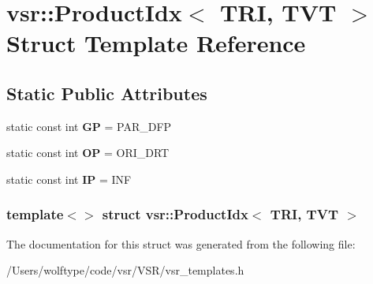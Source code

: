 \hypertarget{structvsr_1_1_product_idx_3_01_t_r_i_00_01_t_v_t_01_4}{\section{vsr\-:\-:Product\-Idx$<$ T\-R\-I, T\-V\-T $>$ Struct Template Reference}
\label{structvsr_1_1_product_idx_3_01_t_r_i_00_01_t_v_t_01_4}
}
\subsection*{Static Public Attributes}
\begin{DoxyCompactItemize}
\item 
\hypertarget{structvsr_1_1_product_idx_3_01_t_r_i_00_01_t_v_t_01_4_a285d21b6f6fbcb2af791c2a0effcf419}{static const int {\bfseries G\-P} = P\-A\-R\-\_\-\-D\-F\-P}\label{structvsr_1_1_product_idx_3_01_t_r_i_00_01_t_v_t_01_4_a285d21b6f6fbcb2af791c2a0effcf419}

\item 
\hypertarget{structvsr_1_1_product_idx_3_01_t_r_i_00_01_t_v_t_01_4_a0d257c826a681805b6006d9fc048092e}{static const int {\bfseries O\-P} = O\-R\-I\-\_\-\-D\-R\-T}\label{structvsr_1_1_product_idx_3_01_t_r_i_00_01_t_v_t_01_4_a0d257c826a681805b6006d9fc048092e}

\item 
\hypertarget{structvsr_1_1_product_idx_3_01_t_r_i_00_01_t_v_t_01_4_a71aa03de8cbaf048ccfd41b77726730a}{static const int {\bfseries I\-P} = I\-N\-F}\label{structvsr_1_1_product_idx_3_01_t_r_i_00_01_t_v_t_01_4_a71aa03de8cbaf048ccfd41b77726730a}

\end{DoxyCompactItemize}
\subsubsection*{template$<$$>$ struct vsr\-::\-Product\-Idx$<$ T\-R\-I, T\-V\-T $>$}



The documentation for this struct was generated from the following file\-:\begin{DoxyCompactItemize}
\item 
/\-Users/wolftype/code/vsr/\-V\-S\-R/vsr\-\_\-templates.\-h\end{DoxyCompactItemize}
